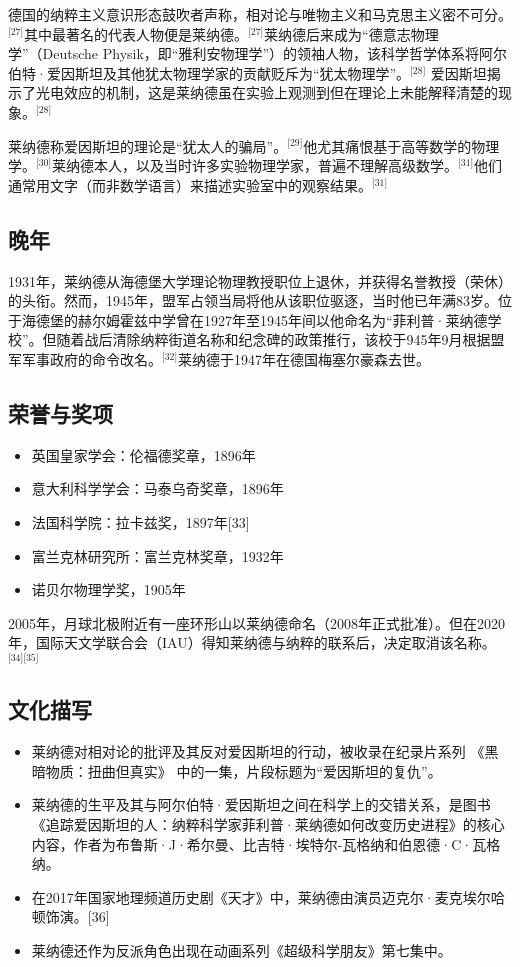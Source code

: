 德国的纳粹主义意识形态鼓吹者声称，相对论与唯物主义和马克思主义密不可分。\(^\text{[27]}\)其中最著名的代表人物便是莱纳德。\(^\text{[27]}\)莱纳德后来成为“德意志物理学”（Deutsche Physik，即“雅利安物理学”）的领袖人物，该科学哲学体系将阿尔伯特·爱因斯坦及其他犹太物理学家的贡献贬斥为“犹太物理学”。\(^\text{[28]}\) 爱因斯坦揭示了光电效应的机制，这是莱纳德虽在实验上观测到但在理论上未能解释清楚的现象。\(^\text{[28]}\)

莱纳德称爱因斯坦的理论是“犹太人的骗局”。\(^\text{[29]}\)他尤其痛恨基于高等数学的物理学。\(^\text{[30]}\)莱纳德本人，以及当时许多实验物理学家，普遍不理解高级数学。\(^\text{[31]}\)他们通常用文字（而非数学语言）来描述实验室中的观察结果。\(^\text{[31]}\)
\subsection{晚年}
1931年，莱纳德从海德堡大学理论物理教授职位上退休，并获得名誉教授（荣休）的头衔。然而，1945年，盟军占领当局将他从该职位驱逐，当时他已年满83岁。位于海德堡的赫尔姆霍兹中学曾在1927年至1945年间以他命名为“菲利普·莱纳德学校”。但随着战后清除纳粹街道名称和纪念碑的政策推行，该校于945年9月根据盟军军事政府的命令改名。\(^\text{[32]}\)莱纳德于1947年在德国梅塞尔豪森去世。
\subsection{荣誉与奖项}
\begin{itemize}
\item 英国皇家学会：伦福德奖章，1896年
\item 意大利科学学会：马泰乌奇奖章，1896年
\item 法国科学院：拉卡兹奖，1897年[33]
\item 富兰克林研究所：富兰克林奖章，1932年
\item 诺贝尔物理学奖，1905年
\end{itemize}
2005年，月球北极附近有一座环形山以莱纳德命名（2008年正式批准）。但在2020年，国际天文学联合会（IAU）得知莱纳德与纳粹的联系后，决定取消该名称。\(^\text{[34][35]}\)
\subsection{文化描写}
\begin{itemize}
\item 莱纳德对相对论的批评及其反对爱因斯坦的行动，被收录在纪录片系列 《黑暗物质：扭曲但真实》 中的一集，片段标题为“爱因斯坦的复仇”。
\item 莱纳德的生平及其与阿尔伯特·爱因斯坦之间在科学上的交错关系，是图书 《追踪爱因斯坦的人：纳粹科学家菲利普·莱纳德如何改变历史进程》的核心内容，作者为布鲁斯·J·希尔曼、比吉特·埃特尔-瓦格纳和伯恩德·C·瓦格纳。
\item 在2017年国家地理频道历史剧《天才》中，莱纳德由演员迈克尔·麦克埃尔哈顿饰演。[36]
\item 莱纳德还作为反派角色出现在动画系列《超级科学朋友》第七集中。
\end{itemize}
